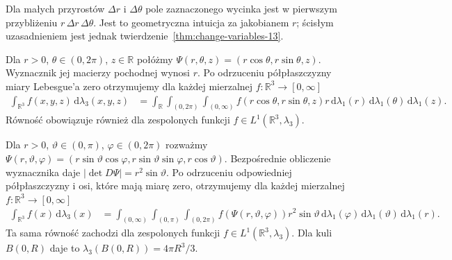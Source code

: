 \begin{center}
\end{center}
\noindent
Dla małych przyrostów $\Delta r$ i $\Delta\theta$ pole
zaznaczonego wycinka jest w pierwszym przybliżeniu
$r\,\Delta r\,\Delta\theta$. Jest to geometryczna intuicja
za jakobianem $r$; ścisłym uzasadnieniem jest jednak
twierdzenie~\ref{thm:change-variables-13}.

\begin{przyklad}
Dla $r>0$, $\theta\in(0,2\pi)$, $z\in\mathbb R$
połóżmy $\Psi(r,\theta,z)=(r\cos\theta,r\sin\theta,z)$.
Wyznacznik jej macierzy pochodnej wynosi $r$.
Po odrzuceniu półpłaszczyzny miary Lebesgue'a zero
otrzymujemy dla każdej mierzalnej
$f:\mathbb R^3\to[0,\infty]$
\[
\begin{aligned}
\int_{\mathbb R^3}f(x,y,z)\,\mathrm d\lambda_3(x,y,z)
&=\int_{\mathbb R}\int_{(0,2\pi)}\int_{(0,\infty)}
 f(r\cos\theta,r\sin\theta,z)r\,
\mathrm d\lambda_1(r)\,\mathrm d\lambda_1(\theta)
\,\mathrm d\lambda_1(z).
\end{aligned}
\]
Równość obowiązuje również dla zespolonych funkcji
$f\in L^1(\mathbb R^3,\lambda_3)$.
\end{przyklad}

\begin{przyklad}
Dla $r>0$, $\vartheta\in(0,\pi)$, $\varphi\in(0,2\pi)$
rozważmy
$\Psi(r,\vartheta,\varphi)=
(r\sin\vartheta\cos\varphi,
 r\sin\vartheta\sin\varphi,r\cos\vartheta)$.
Bezpośrednie obliczenie wyznacznika daje
$|\det D\Psi|=r^2\sin\vartheta$.
Po odrzuceniu odpowiedniej półpłaszczyzny i osi,
które mają miarę zero, otrzymujemy dla każdej mierzalnej
$f:\mathbb R^3\to[0,\infty]$
\begin{align*}
\int_{\mathbb R^3}f(x)\,\mathrm d\lambda_3(x)
&=\int_{(0,\infty)}\int_{(0,\pi)}\int_{(0,2\pi)}
 f(\Psi(r,\vartheta,\varphi))r^2\sin\vartheta\,
 \mathrm d\lambda_1(\varphi)\,\mathrm d\lambda_1(\vartheta)
 \,\mathrm d\lambda_1(r).
\end{align*}
Ta sama równość zachodzi dla zespolonych funkcji
$f\in L^1(\mathbb R^3,\lambda_3)$.
Dla kuli $B(0,R)$ daje to $\lambda_3(B(0,R))=4\pi R^3/3$.
\end{przyklad}

